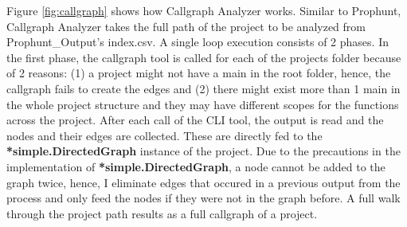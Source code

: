 \documentclass{seal_thesis}
\begin{document}
\noindent Figure \ref{fig:callgraph} shows how Callgraph Analyzer works. Similar to Prophunt, Callgraph Analyzer takes the full path of the project to be analyzed from Prophunt\_Output's index.csv. A single loop execution consists of 2 phases. In the first phase, the callgraph tool is called for each of the projects folder because of 2 reasons: (1) a project might not have a main in the root folder, hence, the callgraph fails to create the edges and (2) there might exist more than 1 main in the whole project structure and they may have different scopes for the functions across the project. After each call of the CLI tool, the output is read and the nodes and their edges are collected. These are directly fed to the \textbf{*simple.DirectedGraph} instance of the project. Due to the precautions in the implementation of \textbf{*simple.DirectedGraph}, a node cannot be added to the graph twice, hence, I eliminate edges that occured in a previous output from the process and only feed the nodes if they were not in the graph before. A full walk through the project path results as a full callgraph of a project.\\
\\
\end{document}
